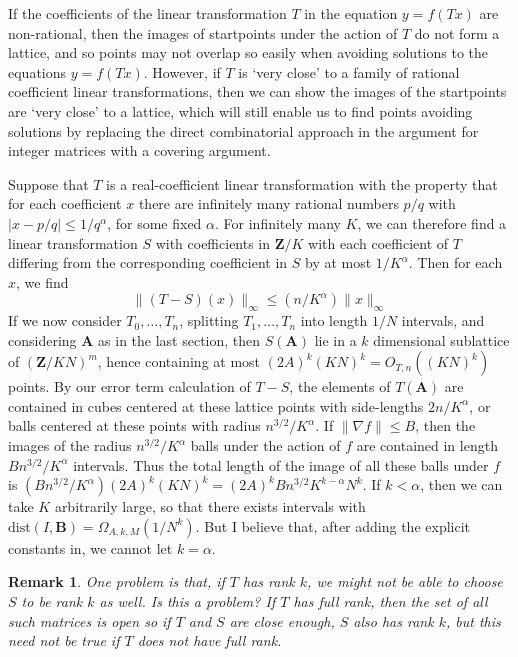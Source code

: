 \documentclass{report}
\theoremstyle{plain}
\theoremstyle{plain}
\newtheorem*{remark}{Remark}
\begin{document}
If the coefficients of the linear transformation $T$ in the equation $y = f(Tx)$ are non-rational, then the images of startpoints under the action of $T$ do not form a lattice, and so points may not overlap so easily when avoiding solutions to the equations $y = f(Tx)$. However, if $T$ is `very close' to a family of rational coefficient linear transformations, then we can show the images of the startpoints are `very close' to a lattice, which will still enable us to find points avoiding solutions by replacing the direct combinatorial approach in the argument for integer matrices with a covering argument.

Suppose that $T$ is a real-coefficient linear transformation with the property that for each coefficient $x$ there are infinitely many rational numbers $p/q$ with $|x - p/q| \leq 1/q^\alpha$, for some fixed $\alpha$. For infinitely many $K$, we can therefore find a linear transformation $S$ with coefficients in $\mathbf{Z}/K$ with each coefficient of $T$ differing from the corresponding coefficient in $S$ by at most $1/K^\alpha$. Then for each $x$, we find
%
\[ \| (T - S)(x) \|_\infty \leq (n/K^\alpha) \| x \|_\infty \]
%
If we now consider $T_0, \dots, T_n$, splitting $T_1, \dots, T_n$ into length $1/N$ intervals, and considering $\mathbf{A}$ as in the last section, then $S(\mathbf{A})$ lie in a $k$ dimensional sublattice of $(\mathbf{Z}/KN)^m$, hence containing at most $(2A)^k (KN)^k = O_{T,n}((KN)^k)$ points. By our error term calculation of $T-S$, the elements of $T(\mathbf{A})$ are contained in cubes centered at these lattice points with side-lengths $2n/K^\alpha$, or balls centered at these points with radius $n^{3/2}/K^\alpha$. If $\| \nabla f \| \leq B$, then the images of the radius $n^{3/2}/K^\alpha$ balls under the action of $f$ are contained in length $Bn^{3/2}/K^\alpha$ intervals. Thus the total length of the image of all these balls under $f$ is $(Bn^{3/2}/K^\alpha)(2A)^k(KN)^k = (2A)^k Bn^{3/2} K^{k-\alpha} N^k$. If $k < \alpha$, then we can take $K$ arbitrarily large, so that there exists intervals with $\text{dist}(I,\mathbf{B}) = \Omega_{A,k,M}(1/N^k)$. But I believe that, after adding the explicit constants in, we cannot let $k = \alpha$.

\begin{remark}
    One problem is that, if $T$ has rank $k$, we might not be able to choose $S$ to be rank $k$ as well. Is this a problem? If $T$ has full rank, then the set of all such matrices is open so if $T$ and $S$ are close enough, $S$ also has rank $k$, but this need not be true if $T$ does not have full rank.
\end{remark}
\end{document}
